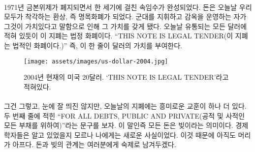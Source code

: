 \paragraph{}
\begin{comment}
	With the abolishment of the gold standard in 1971, this century-long
	sleight-of-hand was complete. Money became the illusion we all share to
	this day: fiat money. It is worth something because someone commanding
	an army and operating jails says it is wort능h something. As can be
	clearly read on every dollar note in circulation today, \enquote{THIS NOTE IS
		LEGAL TENDER}. In other words: It is valuable because the note says so.
\end{comment}
1971년 금본위제가 폐지되면서 한 세기에 걸친 속임수가 완성되었다. 
돈은 오늘날 우리 모두가 착각하는 환상, 즉 명목화폐가 되었다. 
군대를 지휘하고 감옥을 운영하는 자가 그것이 가치있다고 말함으로 인해 그 가치를 갖게 됐다. 
오늘날 유통되는 모든 달러에 적혀 있듯이 이 지폐는 법정 화폐이다. 
\enquote{THIS NOTE IS LEGAL TENDER(이 지폐는 법적인 화폐이다.)}
즉, 이 한 줄이 달러의 가치를 부여한다.

\begin{comment}
	\begin{figure}
		\centering
		\texttt{[image: assets/images/us-dollar-2004.jpg]}
		\caption{A 2004 series U.S. twenty dollar note used today. `THIS NOTE IS LEGAL TENDER'}
		\label{fig:us-dollar-2004}
	\end{figure}
\end{comment}
\begin{figure}
	\centering
	\texttt{[image: assets/images/us-dollar-2004.jpg]}
	\caption{2004년 현재의 미국 20달러. `THIS NOTE IS LEGAL TENDER'라고 적혀있다.}
	\label{fig:us-dollar-2004}
\end{figure}

\paragraph{}
\begin{comment}
	By the way, there is another interesting lesson on today's bank notes,
	hidden in plain sight. The second line reads that this is legal tender
	\enquote{FOR ALL DEBTS, PUBLIC AND PRIVATE}. What might be obvious to economists
	was surprising to me: All money is debt. My head is still hurting
	because of it, and I will leave the exploration of the relation of money
	and debt as an exercise to the reader.
\end{comment}
그건 그렇고, 눈에 잘 띄진 않지만, 오늘날의 지폐에는 흥미로운 교훈이 하나 더 있다. 
두 번째 줄에 적힌 \enquote{FOR ALL DEBTS, PUBLIC AND PRIVATE(공적 및 사적인 모든 부채를 위하여)}라는 문구를 보자. 
이 말인즉 모든 돈은 빚이라는 의미이다. 경제학자들은 알고 있었을지 모르나 나에게는 새로운 사실이었다. 
이것 때문에 아직도 머리가 아프다. 돈과 빚의 관계는 여러분에게 숙제로 남겨두겠다.

